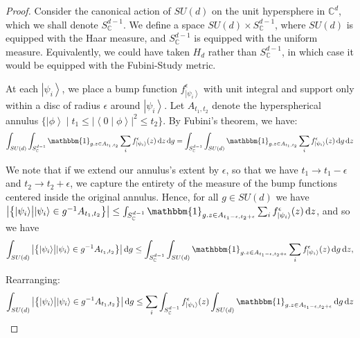 \documentclass{amsart}
\theoremstyle{definition}
\newcommand{\ket}[1]{{\left\vert{#1}\right\rangle}}
\newcommand{\sprod}[2]{\left|\left< {#1} \middle| {#2} \right>\right|}
\newcommand*\dif{\mathop{}\!\mathrm{d}}
\begin{document}
\begin{proof}
Consider the canonical action of $SU(d)$ on the unit hypersphere in $\mathbb{C}^d$, which we shall denote $S_\mathbb{C}^{d-1}$. We define a space $SU(d)\times S_\mathbb{C}^{d-1}$, where $SU(d)$ is equipped with the Haar measure, and $S_\mathbb{C}^{d-1}$ is equipped with the uniform measure. Equivalently, we could have taken $H_d$ rather than $S_\mathbb{C}^{d-1}$, in which case it would be equipped with the Fubini-Study metric.

At each $\ket{\psi_i}$, we place a bump function $f^\epsilon_\ket{\psi_i}$ with unit integral and support only within a disc of radius $\epsilon$ around $\ket{\psi_i}$.
Let $A_{t_1,t_2}$ denote the hyperspherical annulus $\{\ket{\phi}\mid t_1\leq\sprod{0}{\phi}^2\leq t_2\}$. By Fubini's theorem, we have:
\begin{equation}
\int_{SU(d)} \int_{S_\mathbb{C}^{d-1}} \mathbbm{1}_{g.z\in A_{t_1,t_2}} \sum_i f^\epsilon_\ket{\psi_i}(z) \dif z \dif g = \int_{S_\mathbb{C}^{d-1}} \int_{SU(d)}  \mathbbm{1}_{g.z\in A_{t_1,t_2}} \sum_i f^\epsilon_\ket{\psi_i}(z) \dif g \dif z
\end{equation}




We note that if we extend our annulus's extent by $\epsilon$, so that we have $t_1\rightarrow t_1-\epsilon$ and $t_2\rightarrow t_2+\epsilon$, we capture the entirety of the measure of the bump functions centered inside the original annulus. Hence, for all $g\in SU(d)$ we have $\left|\left\{\ket{\psi_i} \middle| \ket{\psi_i} \in g^{-1}A_{t_1,t_2}\right\}\right|\leq \int_{S_\mathbb{C}^{d-1}} \mathbbm{1}_{g.z\in A_{t_1-\epsilon,t_2+\epsilon}} \sum_i f^\epsilon_\ket{\psi_i}(z) \dif z $, and so we have
\begin{equation}
\int_{SU(d)} \left|\left\{\ket{\psi_i} \middle| \ket{\psi_i} \in g^{-1}A_{t_1,t_2}\right\}\right| \dif g \leq \int_{S_\mathbb{C}^{d-1}} \int_{SU(d)}  \mathbbm{1}_{g.z\in A_{t_1-\epsilon,t_2+\epsilon}} \sum_i f^\epsilon_\ket{\psi_i}(z) \dif g \dif z,
\end{equation}

Rearranging:
\begin{equation}
\int_{SU(d)} \left|\left\{\ket{\psi_i} \middle| \ket{\psi_i} \in g^{-1}A_{t_1,t_2}\right\}\right| \dif g \leq \sum_i\int_{S_\mathbb{C}^{d-1}}f^\epsilon_\ket{\psi_i}(z)  \int_{SU(d)} \mathbbm{1}_{g.z\in A_{t_1-\epsilon,t_2+\epsilon}} \dif g \dif z \label{eqn:1} 
\end{equation}


\end{proof}
\end{document}
